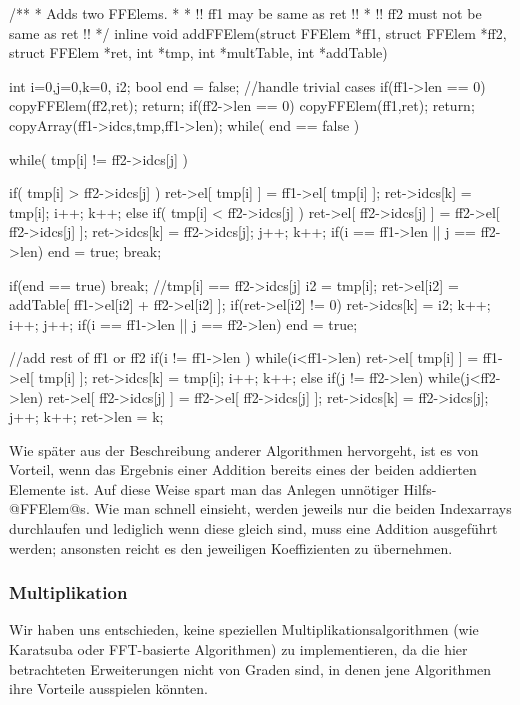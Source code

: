 \begin{ccode}[caption={Aus \url{../Sage/enumeratePCNs.c}},
  firstnumber=226]
/**
 * Adds two FFElems.
 *
 * !! ff1 may be same as ret !!
 * !! ff2 must not be same as ret !!
 */
inline void addFFElem(struct FFElem *ff1, struct FFElem *ff2,
        struct FFElem *ret,
        int *tmp,
        int *multTable, int *addTable){
    int i=0,j=0,k=0, i2;
    bool end = false;
    //handle trivial cases
    if(ff1->len == 0){
        copyFFElem(ff2,ret);
        return;
    }
    if(ff2->len == 0){
        copyFFElem(ff1,ret);
        return;
    }
    copyArray(ff1->idcs,tmp,ff1->len);
    while( end == false ){
        while( tmp[i] != ff2->idcs[j] ){
            if( tmp[i] > ff2->idcs[j] ){
                ret->el[ tmp[i] ] = ff1->el[ tmp[i] ];
                ret->idcs[k] = tmp[i];
                i++; k++;
            }else if( tmp[i] < ff2->idcs[j] ){
                ret->el[ ff2->idcs[j] ] = ff2->el[ ff2->idcs[j] ];
                ret->idcs[k] = ff2->idcs[j];
                j++; k++;
            }
            if(i == ff1->len || j == ff2->len){
                end = true;
                break;
            }

        }
        if(end == true) break;
        //tmp[i] == ff2->idcs[j]
        i2 = tmp[i];
        ret->el[i2] = addTable[ ff1->el[i2] + ff2->el[i2] ];
        if(ret->el[i2] != 0){
            ret->idcs[k] = i2;
            k++;
        }
        i++; j++;
        if(i == ff1->len || j == ff2->len) end = true;
    }
    //add rest of ff1 or ff2
    if(i != ff1->len ){
        while(i<ff1->len){
            ret->el[ tmp[i] ] = ff1->el[ tmp[i] ];
            ret->idcs[k] = tmp[i];
            i++; k++;
        }
    }else if(j != ff2->len){
        while(j<ff2->len){
            ret->el[ ff2->idcs[j] ] = ff2->el[ ff2->idcs[j] ];
            ret->idcs[k] = ff2->idcs[j];
            j++; k++;
        }
    }
    ret->len = k;
}
\end{ccode}  

Wie später aus der Beschreibung anderer Algorithmen hervorgeht, ist es von
Vorteil, wenn das Ergebnis einer Addition bereits eines der beiden addierten
Elemente ist. Auf diese Weise spart man das Anlegen unnötiger Hilfs-@FFElem@s.
Wie man schnell einsieht, werden jeweils nur die beiden Indexarrays durchlaufen
und lediglich wenn diese gleich sind, muss eine Addition ausgeführt werden;
ansonsten reicht es den jeweiligen Koeffizienten zu übernehmen.


\subsubsection{Multiplikation}
Wir haben uns entschieden, keine speziellen Multiplikationsalgorithmen 
(wie Karatsuba oder FFT-basierte Algorithmen) zu implementieren, da
die hier betrachteten Erweiterungen nicht von Graden sind, in denen jene
Algorithmen ihre Vorteile ausspielen könnten.

